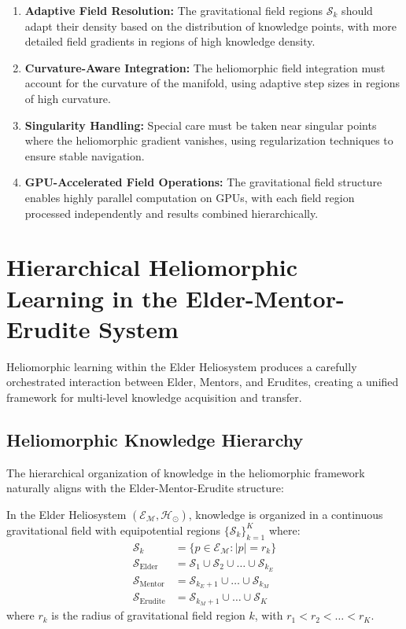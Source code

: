 \begin{enumerate}
    \item \textbf{Adaptive Field Resolution:} The gravitational field regions $\mathcal{S}_k$ should adapt their density based on the distribution of knowledge points, with more detailed field gradients in regions of high knowledge density.
    
    \item \textbf{Curvature-Aware Integration:} The heliomorphic field integration must account for the curvature of the manifold, using adaptive step sizes in regions of high curvature.
    
    \item \textbf{Singularity Handling:} Special care must be taken near singular points where the heliomorphic gradient vanishes, using regularization techniques to ensure stable navigation.
    
    \item \textbf{GPU-Accelerated Field Operations:} The gravitational field structure enables highly parallel computation on GPUs, with each field region processed independently and results combined hierarchically.
\end{enumerate}

\section{Hierarchical Heliomorphic Learning in the Elder-Mentor-Erudite System}\label{sec:hierarchical_heliomorphic_learning}

Heliomorphic learning within the Elder Heliosystem produces a carefully orchestrated interaction between Elder, Mentors, and Erudites, creating a unified framework for multi-level knowledge acquisition and transfer.

\subsection{Heliomorphic Knowledge Hierarchy}

The hierarchical organization of knowledge in the heliomorphic framework naturally aligns with the Elder-Mentor-Erudite structure:

\begin{theorem}
In the Elder Heliosystem $(\mathcal{E}_{\mathcal{M}}, \mathcal{H}_{\odot})$, knowledge is organized in a continuous gravitational field with equipotential regions $\{\mathcal{S}_k\}_{k=1}^K$ where:
\begin{align}
\mathcal{S}_k &= \{p \in \mathcal{E}_{\mathcal{M}} : |p| = r_k\}\\
\mathcal{S}_{\text{Elder}} &= \mathcal{S}_1 \cup \mathcal{S}_2 \cup \ldots \cup \mathcal{S}_{k_E}\\
\mathcal{S}_{\text{Mentor}} &= \mathcal{S}_{k_E+1} \cup \ldots \cup \mathcal{S}_{k_M}\\
\mathcal{S}_{\text{Erudite}} &= \mathcal{S}_{k_M+1} \cup \ldots \cup \mathcal{S}_K
\end{align}
where $r_k$ is the radius of gravitational field region $k$, with $r_1 < r_2 < \ldots < r_K$.
\end{theorem}

